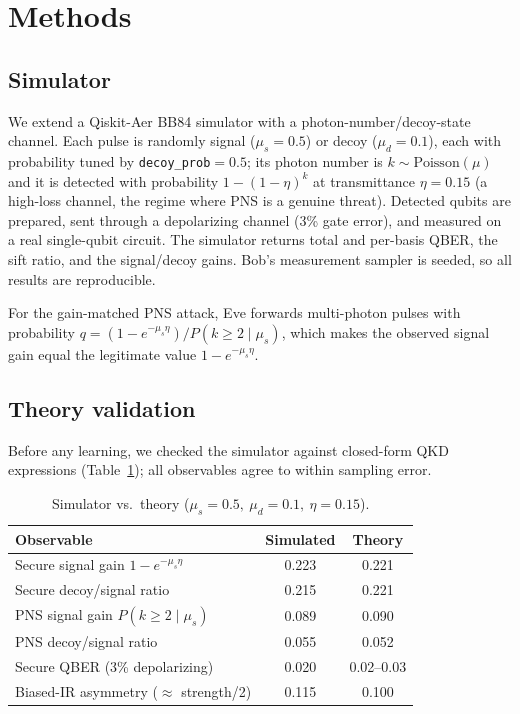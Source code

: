 \documentclass[11pt]{article}
\begin{document}
\section{Methods}
\subsection{Simulator}
We extend a Qiskit-Aer BB84 simulator with a photon-number/decoy-state channel.
Each pulse is randomly signal ($\mu_s=0.5$) or decoy ($\mu_d=0.1$), each with
probability tuned by \texttt{decoy\_prob}$=0.5$; its photon number is
$k\sim\mathrm{Poisson}(\mu)$ and it is detected with probability $1-(1-\eta)^k$ at
transmittance $\eta=0.15$ (a high-loss channel, the regime where PNS is a genuine
threat). Detected qubits are prepared, sent through a depolarizing channel (3\% gate
error), and measured on a real single-qubit circuit. The simulator returns total and
per-basis QBER, the sift ratio, and the signal/decoy gains. Bob's measurement sampler
is seeded, so all results are reproducible.

For the gain-matched PNS attack, Eve forwards multi-photon pulses with probability
$q = (1-e^{-\mu_s\eta}) / P(k\ge 2\mid\mu_s)$, which makes the observed signal gain
equal the legitimate value $1-e^{-\mu_s\eta}$.

\subsection{Theory validation}
Before any learning, we checked the simulator against closed-form QKD expressions
(Table~\ref{tab:theory}); all observables agree to within sampling error.

\begin{table}[h]
  \centering
  \caption{Simulator vs.\ theory ($\mu_s{=}0.5,\ \mu_d{=}0.1,\ \eta{=}0.15$).}
  \label{tab:theory}
  \begin{tabular}{lcc}
    \toprule
    Observable & Simulated & Theory \\
    \midrule
    Secure signal gain $1-e^{-\mu_s\eta}$        & 0.223 & 0.221 \\
    Secure decoy/signal ratio                    & 0.215 & 0.221 \\
    PNS signal gain $P(k\ge2\mid\mu_s)$          & 0.089 & 0.090 \\
    PNS decoy/signal ratio                       & 0.055 & 0.052 \\
    Secure QBER (3\% depolarizing)               & 0.020 & 0.02--0.03 \\
    Biased-IR asymmetry ($\approx$ strength/2)   & 0.115 & 0.100 \\
    \bottomrule
  \end{tabular}
\end{table}
\end{document}
